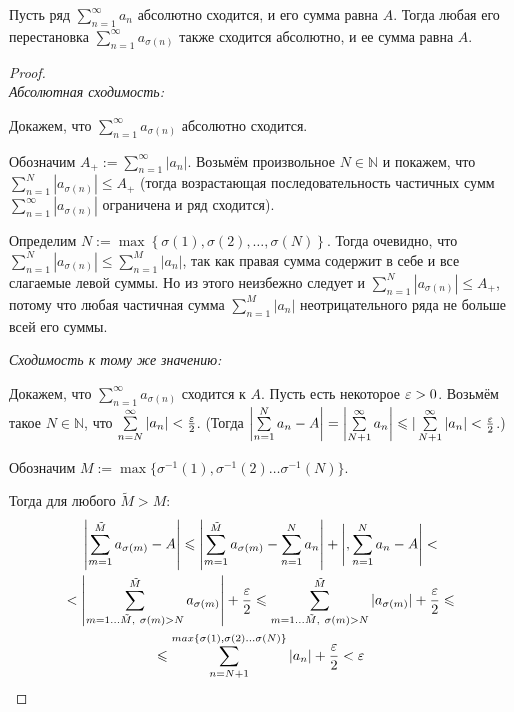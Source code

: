 \documentclass[a4paper, 12pt]{article}
\begin{document}
	\begin{Theorem}[Коши]
		Пусть ряд $\sum\limits_{n=1}^{\infty}a_n$ абсолютно сходится, и его сумма равна $A$. Тогда любая его перестановка $\sum\limits_{n=1}^{\infty}a_{\sigma(n)}$ также сходится абсолютно, и ее сумма равна $A$.
	\end{Theorem}
	\begin{proof}\ \\
	\textit{Абсолютная сходимость:}
	
	Докажем, что $\sum\limits_{n=1}^{\infty}a_{\sigma(n)}$ абсолютно сходится.
			
			Обозначим $A_+ := \sum\limits_{n=1}^{\infty}|a_n|$.
			Возьмём произвольное $N\in \mathbb{N}$ и покажем, что  $\sum\limits_{n=1}^{N}|a_{\sigma(n)}| \leq A_+$ (тогда возрастающая последовательность частичных сумм $\sum\limits_{n=1}^{\infty}|a_{\sigma(n)}|$ ограничена и ряд сходится).

			Определим $N := \max \left\{\sigma(1), \sigma(2), \dots, \sigma(N)\right\}$.  Тогда очевидно, что $\sum\limits_{n=1}^{N}|a_{\sigma(n)}| \leq \sum\limits_{n=1}^{M}|a_{n}|$, так как правая сумма содержит в себе и все слагаемые левой суммы. Но из этого неизбежно следует и  $\sum\limits_{n=1}^{N}|a_{\sigma(n)}| \leq A_+$, потому что любая частичная сумма $\sum\limits_{n=1}^{M}|a_{n}|$ неотрицательного ряда не больше всей его суммы.
	
	\textit{Сходимость к тому же значению:}
	
		 Докажем, что $\sum\limits_{n=1}^{\infty}a_{\sigma(n)}$ сходится к $A$. Пусть есть некоторое $\varepsilon>0$. Возьмём такое $N\in \mathbb{N}$, что $\sum\limits_{n=N}^{\infty}|a_{n}|< \frac{\varepsilon}{2}$. (Тогда $\left| \sum\limits_{n=1}^{N}a_{n} - A\right| = \left| \sum\limits_{N+1}^{\infty}a_{n}\right| \leqslant |\sum\limits_{N+1}^{\infty}|a_{n}| < \frac{\varepsilon}{2}$.)
		 
		 Обозначим $M := \max\{ \sigma^{-1}(1), \sigma^{-1}(2)\dots \sigma^{-1}(N)\}$.
		 
		 Тогда для любого $\tilde{M}>M$:
		\begin{multline}
		 \left| \sum\limits_{m=1}^{\tilde{M}}a_{\sigma(m)} -A \right|\leqslant \left| \sum\limits_{m=1}^{\tilde{M}}a_{\sigma(m)} - \sum\limits_{n=1}^{N}a_{n} \right| + \left| , \sum\limits_{n=1}^{N}a_{n} - A \right| < \\ <
		 \left| \sum\limits_{m=1\dots \tilde{M},\ \sigma(m)>N }^{\tilde{M}}a_{\sigma(m)}\right| + \frac{\varepsilon}{2} \leqslant   \sum\limits_{m=1\dots \tilde{M},\ \sigma(m)>N }^{\tilde{M}}|a_{\sigma(m)}| + \frac{\varepsilon}{2} \leqslant \\ \leqslant
		 \sum\limits_{n=N+1}^{max\{ \sigma(1), \sigma(2)\dots \sigma(N)\}}|a_n| + \frac{\varepsilon}{2} < \varepsilon
		 \end{multline}	
	\end{proof}
	
\end{document}
